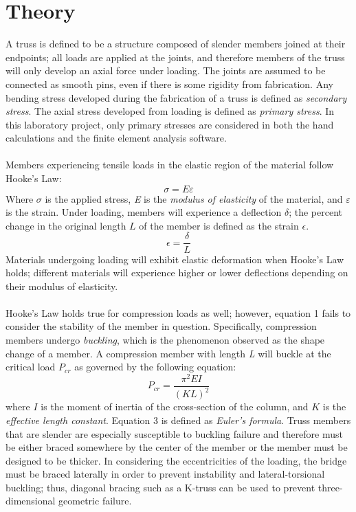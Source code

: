 \documentclass{article}
\begin{document}
    \section{Theory}
    \noindent A truss is defined to be a structure composed of slender members joined at their endpoints; all loads are applied at the joints, and therefore  members of the truss will only develop an axial force under loading. The joints are assumed to be connected as smooth pins, even if there is some rigidity from fabrication. Any bending stress developed during the fabrication of a truss is defined as \emph{secondary stress}. The axial stress developed from loading is defined as \emph{primary stress}. In this laboratory project, only primary stresses are considered in both the hand calculations and the finite element analysis software.
    \\\\
    Members experiencing tensile loads in the elastic region of the material follow Hooke's Law: 
    \begin{equation}
        \sigma = E \varepsilon 
    \end{equation}
    Where $\sigma$ is the applied stress, \emph{E} is the \emph{modulus of elasticity} of the material, and $\varepsilon$ is the strain. 
    Under loading, members will experience a deflection $\delta$; the percent change in the original length $L$ of the member is defined as the strain $\epsilon$. 
        \begin{equation}
            \epsilon = \frac{\delta}{L}
        \end{equation}
    Materials undergoing loading will exhibit elastic deformation when Hooke's Law holds; different materials will experience higher or lower deflections depending on their modulus of elasticity.
    \\\\Hooke's Law holds true for compression loads as well; however, equation 1 fails to consider the stability of the member in question. Specifically, compression members undergo \emph{buckling}, which is the phenomenon observed as the shape change of a member. A compression member with length \emph{L} will buckle at the critical load $P_{cr}$ as governed by the following equation: 
    \begin{equation}
        P_{cr} = \frac{\pi^2 E I}{(KL)^2} 
    \end{equation}
    where $I$ is the moment of inertia of the cross-section of the column, and $K$ is the \emph{effective length constant}. Equation 3 is defined as \emph{Euler's formula}. Truss members that are slender are especially susceptible to buckling failure and therefore must be either braced somewhere by the center of the member or the member must be designed to be thicker. In considering the eccentricities of the loading, the bridge must be braced laterally in order to prevent instability and lateral-torsional buckling; thus, diagonal bracing such as a K-truss can be used to prevent three-dimensional geometric failure. \\
\end{document}
